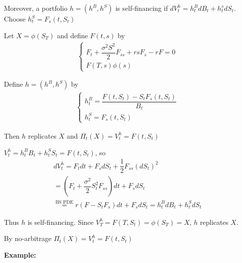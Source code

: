 \noindent Moreover, a portfolio $h = (h^B, h^S)$ is self-financing if $dV_t^h = h_t^BdB_t+h_t^sdS_t$. Choose $h_t^S = F_s(t,S_t)$
\par\bigskip
\begin{theo}[]{}
  Let $X = \phi(S_T)$ and define $F(t,s)$ by 
  \begin{equation*}
    \begin{gathered}
      \begin{cases}
        F_t + \dfrac{\sigma^2S^2}{2}F_{ss}+rsF_s-rF = 0\\
        F(T,s)\phi(s)
      \end{cases}
    \end{gathered}
  \end{equation*}
  \par\bigskip
  \noindent Define $h = (h^B,h^S)$ by 
  \begin{equation*}
    \begin{gathered}
      \begin{cases}
        h_t^B = \dfrac{F(t,S_t)-S_tF_s(t,S_t)}{B_t}\\
        h_t^S = F_s(t,S_t)
      \end{cases}
    \end{gathered}
  \end{equation*}
  \par\bigskip
  \noindent Then $h$ replicates $X$ and $\Pi_t(X) = V_t^h = F(t,S_t)$
\end{theo}
\par\bigskip
\begin{prf}[]{}
  $V_t^h = h_t^BB_t + h_t^SS_t = F(t,S_t)$, so 
  \begin{equation*}
    \begin{gathered}
      dV_t^h = F_tdt + F_sdS_t + \dfrac{1}{2}F_{ss}(dS_t)^2\\
      = \left(F_t + \dfrac{\sigma^2}{2}S_t^2F_{ss}\right)dt + F_sdS_t\\
      \stackrel{\text{BS PDE}}{=} r(F-S_tF_s)dt + F_sdS_t = h_t^BdB_t+h_t^SdS_t
    \end{gathered}
  \end{equation*}
  \par\bigskip
  \noindent Thus $h$ is self-financing. Since $V_T^h = F(T,S_t)= \phi(S_T) = X$, $h$ replicates $X$.\par
  \noindent By no-arbitrage $\Pi_t(X) = V_t^h = F(t,S_t)$
\end{prf}
\par\bigskip
\noindent\textbf{Example:}\par
